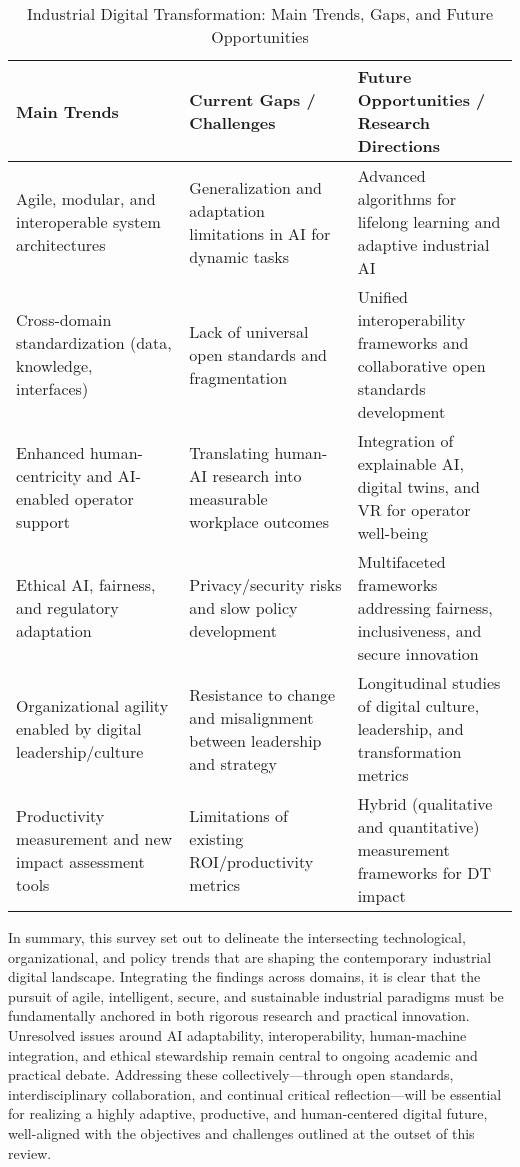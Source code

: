 \documentclass[sigconf]{acmart}
\begin{document}
\begin{table*}[htbp]
\centering
\caption{Industrial Digital Transformation: Main Trends, Gaps, and Future Opportunities}
\label{tab:trends_gaps_opportunities}
\begin{adjustbox}{max width=\textwidth}
\begin{tabular}{@{}lll@{}}
\toprule
\textbf{Main Trends} & \textbf{Current Gaps / Challenges} & \textbf{Future Opportunities / Research Directions} \\
\midrule
Agile, modular, and interoperable system architectures~\cite{ref3}\cite{ref68} & Generalization and adaptation limitations in AI for dynamic tasks~\cite{ref19}\cite{ref20}\cite{ref54} & Advanced algorithms for lifelong learning and adaptive industrial AI \\
Cross-domain standardization (data, knowledge, interfaces)~\cite{ref13}\cite{ref86} & Lack of universal open standards and fragmentation~\cite{ref13}\cite{ref86} & Unified interoperability frameworks and collaborative open standards development \\
Enhanced human-centricity and AI-enabled operator support~\cite{ref45}\cite{ref83}\cite{ref90} & Translating human-AI research into measurable workplace outcomes & Integration of explainable AI, digital twins, and VR for operator well-being \\
Ethical AI, fairness, and regulatory adaptation~\cite{ref35}\cite{ref41}\cite{ref90} & Privacy/security risks and slow policy development~\cite{ref35}\cite{ref41} & Multifaceted frameworks addressing fairness, inclusiveness, and secure innovation \\
Organizational agility enabled by digital leadership/culture~\cite{ref93} & Resistance to change and misalignment between leadership and strategy~\cite{ref93} & Longitudinal studies of digital culture, leadership, and transformation metrics \\
Productivity measurement and new impact assessment tools~\cite{ref86}\cite{ref94} & Limitations of existing ROI/productivity metrics & Hybrid (qualitative and quantitative) measurement frameworks for DT impact \\
\bottomrule
\end{tabular}
\end{adjustbox}
\end{table*}

In summary, this survey set out to delineate the intersecting technological, organizational, and policy trends that are shaping the contemporary industrial digital landscape. Integrating the findings across domains, it is clear that the pursuit of agile, intelligent, secure, and sustainable industrial paradigms must be fundamentally anchored in both rigorous research and practical innovation. Unresolved issues around AI adaptability, interoperability, human-machine integration, and ethical stewardship remain central to ongoing academic and practical debate. Addressing these collectively---through open standards, interdisciplinary collaboration, and continual critical reflection---will be essential for realizing a highly adaptive, productive, and human-centered digital future, well-aligned with the objectives and challenges outlined at the outset of this review.



\end{document}
